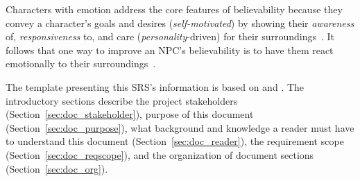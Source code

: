 Characters with emotion address the core features of believability because they 
convey a character's goals and desires (\textit{self-motivated}) by showing 
their \textit{awareness} of, \textit{responsiveness} to, and care 
(\textit{personality}-driven) for their surroundings~\citep{bates1994, 
broekens2021emotion, reilly1996believable}. It follows that one way to improve 
an NPC's believability is to have them react emotionally to their 
surroundings~\citep{togelius2013assessing, yannakakis2015emotion}.

The template presenting this SRS's information is based on 
\citet{SmithAndLai2005} and \citet{SmithEtAl2007}. The introductory sections 
describe the project stakeholders (Section~\ref{sec:doc_stakeholder}), purpose 
of this document (Section~\ref{sec:doc_purpose}), what background and knowledge 
a reader must have to understand this document (Section~\ref{sec:doc_reader}), 
the requirement scope (Section~\ref{sec:doc_reqscope}), and the organization of 
document sections (Section~\ref{sec:doc_org}).









